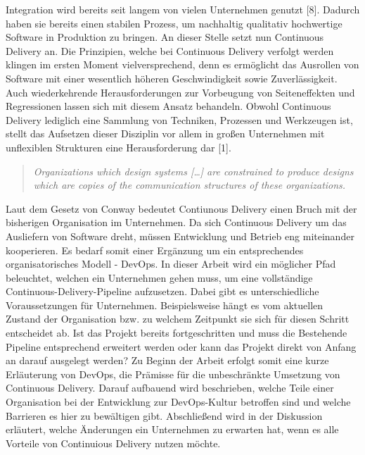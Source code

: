 
 Integration wird bereits seit langem von vielen Unternehmen genutzt [8]. Dadurch haben sie bereits einen stabilen Prozess, um nachhaltig qualitativ hochwertige Software in Produktion zu bringen. An dieser Stelle setzt nun Continuous Delivery an. Die Prinzipien, welche bei Continuous Delivery verfolgt werden klingen im ersten Moment vielversprechend, denn es ermöglicht das Ausrollen von Software mit einer wesentlich höheren Geschwindigkeit sowie Zuverlässigkeit. Auch wiederkehrende Herausforderungen zur Vorbeugung von Seiteneffekten und Regressionen lassen sich mit diesem Ansatz behandeln. Obwohl Continuous Delivery lediglich eine Sammlung von Techniken, Prozessen und Werkzeugen ist, stellt das Aufsetzen dieser Disziplin vor allem in großen Unternehmen mit unflexiblen Strukturen eine Herausforderung dar [1]. 

\begin{quote} \textit{\glqq Organizations which design systems […] are constrained to produce designs which are copies of the communication structures of these organizations. \grqq~}\cite[S.5]{Farley.2011} \end{quote} 

Laut dem Gesetz von Conway bedeutet Contiunous Delivery einen Bruch mit der bisherigen Organisation im Unternehmen. Da sich Continuous Delivery um das Ausliefern von Software dreht, müssen Entwicklung und Betrieb eng miteinander kooperieren. Es bedarf somit einer Ergänzung um ein entsprechendes organisatorisches Modell - DevOps. In dieser Arbeit wird ein möglicher Pfad beleuchtet, welchen ein Unternehmen gehen muss, um eine vollständige Continuous-Delivery-Pipeline aufzusetzen. Dabei gibt es unterschiedliche Voraussetzungen für Unternehmen. Beispielsweise hängt es vom aktuellen Zustand der Organisation bzw. zu welchem Zeitpunkt sie sich für diesen Schritt entscheidet ab. Ist das Projekt bereits fortgeschritten und muss die Bestehende Pipeline entsprechend erweitert werden oder kann das Projekt direkt von Anfang an darauf ausgelegt werden? Zu Beginn der Arbeit erfolgt somit eine kurze Erläuterung von DevOps, die Prämisse für die unbeschränkte Umsetzung von Continuous Delivery. Darauf aufbauend wird beschrieben, welche Teile einer Organisation bei der Entwicklung zur DevOps-Kultur betroffen sind und welche Barrieren es hier zu bewältigen gibt. Abschließend wird in der Diskussion erläutert, welche Änderungen ein Unternehmen zu erwarten hat, wenn es alle Vorteile von Continuious Delivery nutzen möchte.
